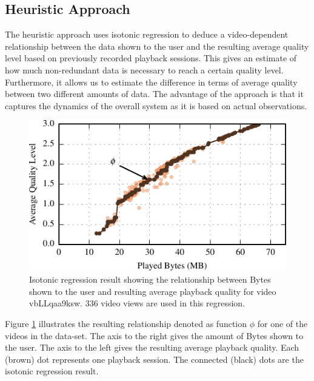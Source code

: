 
\subsection{Heuristic Approach}
\label{sec:heu}

The heuristic approach uses isotonic regression \cite{barlow1972statistical} to deduce a video-dependent relationship between the data shown to the user and the resulting average quality level based on previously recorded playback sessions.
This gives an estimate of how much non-redundant data is necessary to reach a certain quality level.
Furthermore, it allows us to estimate the difference in terms of average quality between two different amounts of data.
The advantage of the approach is that it captures the dynamics of the overall system as it is based on actual observations.

\begin{figure}[t]
\centering
\includegraphics[width=\columnwidth]{figs/32_vbLLqaa9ksw.pdf}%
\caption{Isotonic regression result showing the relationship between Bytes shown to the user and resulting average playback quality for video vbLLqaa9ksw. 336 video views are used in this regression.}
\label{fig:heuristic}%
\end{figure}

Figure \ref{fig:heuristic} illustrates the resulting relationship denoted as function $\phi$ for one of the videos in the data-set.
The axis to the right gives the amount of Bytes shown to the user.
The axis to the left gives the resulting average playback quality.
Each (brown) dot represents one playback session.
The connected (black) dots are the isotonic regression result.

